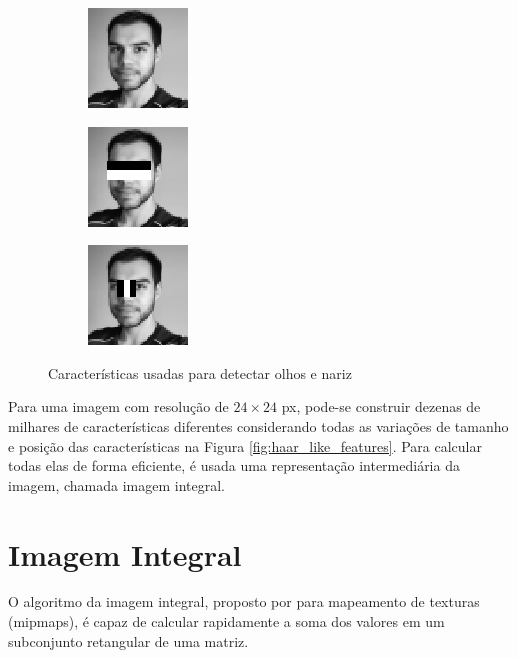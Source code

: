 \begin{figure}[htbp]
    \begin{subfigure}[c]{0.3\textwidth}
    \centering
    \includegraphics{figs/julio_haar1.png}
    \caption{}
    \end{subfigure}
    \begin{subfigure}[c]{0.3\textwidth}
    \centering
    \includegraphics{figs/julio_haar2.png}
    \caption{}
    \end{subfigure}
    \begin{subfigure}[c]{0.3\textwidth}
    \centering
    \includegraphics{figs/julio_haar3.png}
    \caption{}
    \end{subfigure}
    \caption{Características usadas para detectar olhos e nariz}
    \label{fig:julio_haar}
\end{figure}

Para uma imagem com resolução de $24\times24$ px, pode-se construir dezenas de milhares de características diferentes considerando todas as variações de tamanho e posição das características na Figura \ref{fig:haar_like_features}. Para calcular todas elas de forma eficiente, é usada uma representação intermediária da imagem, chamada imagem integral.


\section{Imagem Integral}

O algoritmo da imagem integral, proposto por \citet{crow1984summed} para mapeamento de texturas (mipmaps), é capaz de calcular rapidamente a soma dos valores em um subconjunto retangular de uma matriz.

